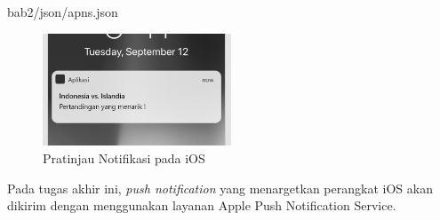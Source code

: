  {bab2/json/apns.json}
\begin{figure}[H]
	\centering\includegraphics[width=0.5\textwidth]{bab2/img/apns.jpg}
	\caption{Pratinjau Notifikasi pada iOS}
	\label{img:contoh-hasil-apns}
\end{figure}
\par Pada tugas akhir ini, \textit{push notification} yang menargetkan perangkat iOS akan dikirim dengan menggunakan layanan Apple Push Notification Service.

